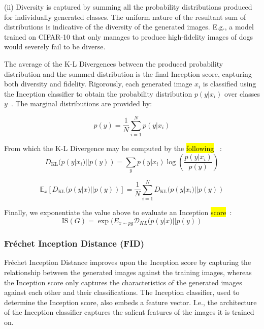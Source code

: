 \documentclass[technologies,article,accept,pdftex,moreauthors]{Definitions/mdpi}
\begin{document}
(ii) Diversity is captured by summing all the probability distributions produced for individually generated classes. The uniform nature of the resultant sum of distributions is indicative of the diversity of the generated images. E.g., a model trained on CIFAR-10 that only manages to produce high-fidelity images of dogs would severely fail to be diverse.



The average of the K-L Divergences between the produced probability distribution and the summed distribution is the final Inception score, capturing both diversity and fidelity.
Rigorously, each generated image $x_i$ is classified using the Inception classifier to obtain the probability distribution $p(y|x_i)$ over classes $y$~\cite{isscore}. The marginal distributions are provided by: 

\begin{equation}
p(y) = \frac{1}{N} \sum_{i=1}^{N} p(y|x_i)
\end{equation}

From which the K-L Divergence may be computed by the \hl{following}%
~\cite{isscore}:
\begin{equation}
    D_{\text{KL}}(p(y|x_i) || p(y)) = \sum_{y} p(y|x_i) \log \left( \frac{p(y|x_i)}{p(y)} \right)
\end{equation}

\begin{equation}
    \mathbb{E}_{x}[D_{\text{KL}}(p(y|x) || p(y))] = \frac{1}{N} \sum_{i=1}^{N} D_{\text{KL}}(p(y|x_i) || p(y)) 
\end{equation}

Finally, we exponentiate the value above to evaluate an Inception \hl{score}~\cite{isscore}:
\begin{equation}
\text{IS}(G) = \exp (E_{x\sim pg} \mathcal{D}_{KL}(p(y|x) || p(y))
\end{equation}

\subsubsection{Fréchet Inception Distance (FID)}
Fréchet Inception Distance improves upon the Inception score by capturing the relationship between the generated images against the training images, whereas the Inception score only captures the characteristics of the generated images against each other and their classifications. The Inception classifier, used to determine the Inception score, also embeds a feature vector. I.e., the architecture of the Inception classifier captures the salient features of the images it is trained on.
\end{document}
